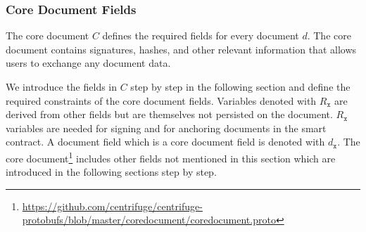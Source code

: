 
\subsubsection{Core Document Fields\label{Core Document}}\label{sec:doc_core_doc_fields}
The core document $C$ defines the required fields for every document $d$.
The core document contains signatures, hashes, and other relevant information that allows users to exchange any document data.
 
We introduce the fields in $C$ step by step in the following section and define the required constraints of the core document fields. Variables denoted with $R_{\texttt{x}}$ are derived from other fields but are themselves not persisted on the document. $R_{\texttt{x}}$ variables are needed for signing and for anchoring documents in the smart contract. A document field which is a core document field is denoted with $d_{\texttt{x}}$. 
The core document\footnote{\url{https://github.com/centrifuge/centrifuge-protobufs/blob/master/coredocument/coredocument.proto}} includes other fields not mentioned in this section which are introduced in the following sections step by step.
